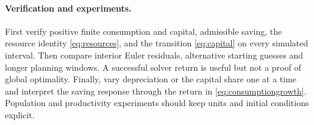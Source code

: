 \documentclass[11pt,a4paper]{article}
\begin{document}
\paragraph{Verification and experiments.}
First verify positive finite consumption and capital, admissible saving,
the resource identity \eqref{eq:resources}, and the transition
\eqref{eq:capital} on every simulated interval. Then compare interior Euler
residuals, alternative starting guesses and longer planning windows.
A successful solver return is useful but not a proof of global optimality.
Finally, vary depreciation or the capital share one at a time and interpret
the saving response through the return in \eqref{eq:consumptiongrowth}.
Population and productivity experiments should keep units and initial
conditions explicit.
\end{document}
